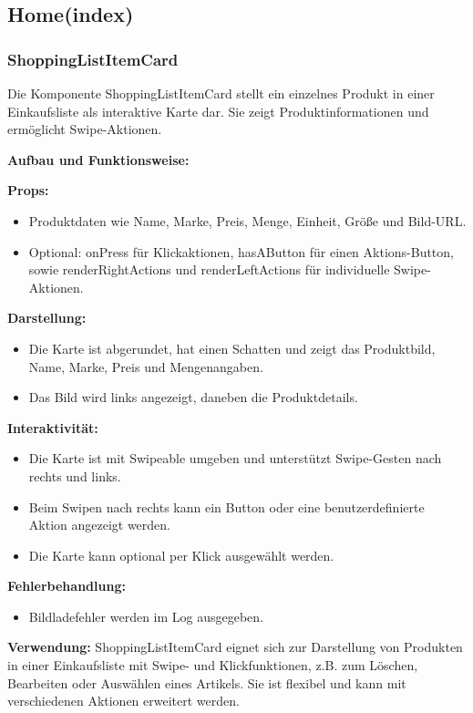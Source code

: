 \documentclass[12pt, a4paper]{report} %
\begin{document}
\subsection{Home(index)}

\subsubsection{ShoppingListItemCard}
Die Komponente ShoppingListItemCard stellt ein einzelnes Produkt in einer Einkaufsliste als interaktive Karte dar. Sie zeigt Produktinformationen und ermöglicht Swipe-Aktionen.

\noindent\textbf{Aufbau und Funktionsweise:}

\textbf{Props:}
\begin{itemize}
    \item Produktdaten wie Name, Marke, Preis, Menge, Einheit, Größe und Bild-URL.
    \item Optional: onPress für Klickaktionen, hasAButton für einen Aktions-Button, sowie renderRightActions und renderLeftActions für individuelle Swipe-Aktionen.
\end{itemize}

\textbf{Darstellung:}
\begin{itemize}
    \item Die Karte ist abgerundet, hat einen Schatten und zeigt das Produktbild, Name, Marke, Preis und Mengenangaben.
    \item Das Bild wird links angezeigt, daneben die Produktdetails.
\end{itemize}

\textbf{Interaktivität:}
\begin{itemize}
    \item Die Karte ist mit Swipeable umgeben und unterstützt Swipe-Gesten nach rechts und links.
    \item Beim Swipen nach rechts kann ein Button oder eine benutzerdefinierte Aktion angezeigt werden.
    \item Die Karte kann optional per Klick ausgewählt werden.
\end{itemize}

\textbf{Fehlerbehandlung:}
\begin{itemize}
    \item Bildladefehler werden im Log ausgegeben.
\end{itemize}

\noindent\textbf{Verwendung:} ShoppingListItemCard eignet sich zur Darstellung von Produkten in einer Einkaufsliste mit Swipe- und Klickfunktionen, z.B. zum Löschen, Bearbeiten oder Auswählen eines Artikels. Sie ist flexibel und kann mit verschiedenen Aktionen erweitert werden.
\end{document}
